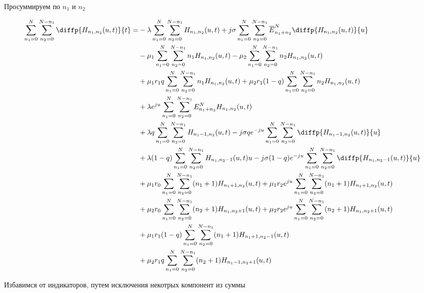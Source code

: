 Просуммируем по $n_{1}$ и $n_{2}$

\begin{equation*}
\begin{aligned}
	\sum_{n_1=0}^N \sum_{n_2=0}^{N-n_1}\diffp{H_{n_1,n_2}(u,t)}{t}=
	&-\lambda \sum_{n_1=0}^N\sum_{n_2=0}^{N-n_1}
	H_{n_1, n_2}(u,t)
	+j\sigma \sum_{n_1=0}^N\sum_{n_2=0}^{N-n_1}
	\overline{E}^N_{n_1+n_2}\diffp{H_{n_1, n_2}(u,t)}{u}\\
	&-\mu_1 \sum_{n_1=0}^N\sum_{n_2=0}^{N-n_1}
	n_1 H_{n_1, n_2}(u,t)
	-\mu_2 \sum_{n_1=0}^N\sum_{n_2=0}^{N-n_1}
	n_2 H_{n_1, n_2}(u,t)\\
	&+\mu_1 r_1 q \sum_{n_1=0}^N\sum_{n_2=0}^{N-n_1}
	n_1 H_{n_1, n_2}(u,t)
	+\mu_2 r_1 (1-q)\sum_{n_1=0}^N\sum_{n_2=0}^{N-n_1} 
	n_2 H_{n_1, n_2}(u,t)\\
	&+\lambda e^{ju}\sum_{n_1=0}^N\sum_{n_2=0}^{N-n_1}
	E^N_{n_1+n_2}H_{n_1, n_2}(u,t)\\
	&+\lambda q \sum_{n_1=0}^N\sum_{n_2=0}^{N-n_1}
	H_{n_1-1, n_2}(u,t)
	-j \sigma q e^{-ju}\sum_{n_1=0}^N\sum_{n_2=0}^{N-n_1}
	\diffp{H_{n_1-1, n_2}(u,t)}{u}\\
	&+\lambda (1-q) \sum_{n_1=0}^N\sum_{n_2=0}^{N-n_1}
	H_{n_1, n_2-1}(u,t){u}
	-j \sigma (1-q) e^{-ju}\sum_{n_1=0}^N\sum_{n_2=0}^{N-n_1}
	\diffp{H_{n_1, n_2-1}(u,t)}{u}\\
	&+\mu_1 r_0 \sum_{n_1=0}^N\sum_{n_2=0}^{N-n_1}
	(n_1+1) H_{n_1+1, n_2}(u,t)
	+\mu_1 r_2 e^{ju} \sum_{n_1=0}^N\sum_{n_2=0}^{N-n_1}
	(n_1+1) H_{n_1+1, n_2}(u,t)\\
	&+\mu_2 r_0 \sum_{n_1=0}^N\sum_{n_2=0}^{N-n_1}
	(n_2+1) H_{n_1, n_2+1}(u,t)
	+\mu_2 r_2 e^{ju} \sum_{n_1=0}^N\sum_{n_2=0}^{N-n_1}
	(n_2+1) H_{n_1, n_2+1}(u,t)\\
	&+\mu_1 r_1 (1-q) \sum_{n_1=0}^N\sum_{n_2=0}^{N-n_1}
	(n_1+1)H_{n_1+1, n_2-1}(u,t)\\
	&+\mu_2 r_1 q \sum_{n_1=0}^N\sum_{n_2=0}^{N-n_1}
	(n_2+1)H_{n_1-1, n_2+1}(u,t)\\	
\end{aligned}
\end{equation*}

Избавимся от индикаторов, путем исключения некотрых компонент из суммы

